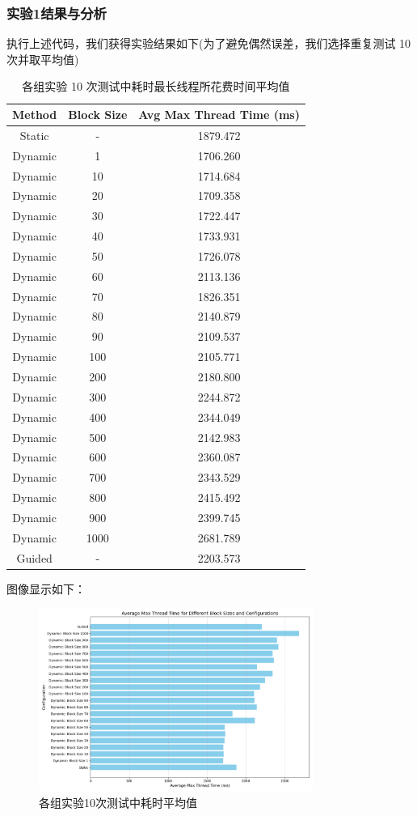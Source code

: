 \documentclass{nku}
\begin{document}
\subsubsection{实验1结果与分析}
执行上述代码，我们获得实验结果如下(为了避免偶然误差，我们选择重复测试 10 次并取平均值)

\begin{table}[H]
\centering
\caption{各组实验 10 次测试中耗时最长线程所花费时间平均值}
\begin{tabular}{ccc}
\toprule
\textbf{Method} & \textbf{Block Size} & \textbf{Avg Max Thread Time (ms)} \\
\midrule
Static & - & 1879.472 \\
Dynamic & 1 & 1706.260 \\
Dynamic & 10 & 1714.684 \\
Dynamic & 20 & 1709.358 \\
Dynamic & 30 & 1722.447 \\
Dynamic & 40 & 1733.931 \\
Dynamic & 50 & 1726.078 \\
Dynamic & 60 & 2113.136 \\
Dynamic & 70 & 1826.351 \\
Dynamic & 80 & 2140.879 \\
Dynamic & 90 & 2109.537 \\
Dynamic & 100 & 2105.771 \\
Dynamic & 200 & 2180.800 \\
Dynamic & 300 & 2244.872 \\
Dynamic & 400 & 2344.049 \\
Dynamic & 500 & 2142.983 \\
Dynamic & 600 & 2360.087 \\
Dynamic & 700 & 2343.529 \\
Dynamic & 800 & 2415.492 \\
Dynamic & 900 & 2399.745 \\
Dynamic & 1000 & 2681.789 \\
Guided & - & 2203.573 \\
\bottomrule
\end{tabular}
\label{table:scheduling_results_detailed}
\end{table}

图像显示如下：
\begin{figure}[H]
\centering
\includegraphics[width=0.8\textwidth]{fig/fig3.png}
\caption{各组实验10次测试中耗时平均值}
\end{figure}
\end{document}
